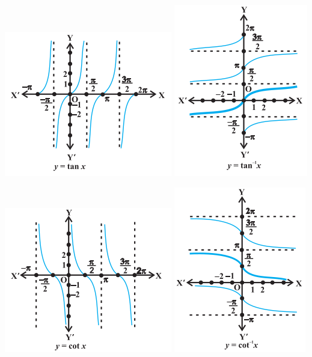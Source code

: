 \documentclass[12pt]{article}
\begin{document}
\begin{multicols}{2}
\includegraphics[scale=0.5]{6.png}
\includegraphics[scale=0.5]{61.png}



\includegraphics[scale=0.5]{7.png}
\includegraphics[scale=0.5]{71.png}

\end{multicols}
\end{document}
